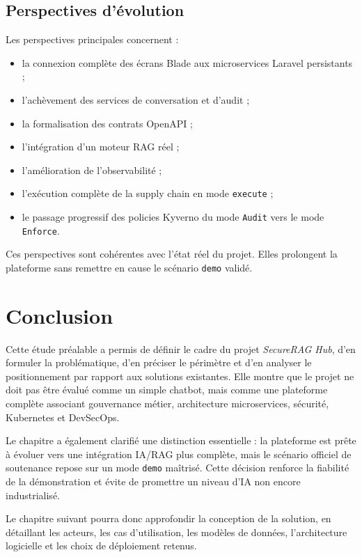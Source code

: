 \subsection{Perspectives d'évolution}

Les perspectives principales concernent :

\begin{itemize}
    \item la connexion complète des écrans Blade aux microservices Laravel persistants ;
    \item l'achèvement des services de conversation et d'audit ;
    \item la formalisation des contrats OpenAPI ;
    \item l'intégration d'un moteur RAG réel ;
    \item l'amélioration de l'observabilité ;
    \item l'exécution complète de la supply chain en mode \texttt{execute} ;
    \item le passage progressif des policies Kyverno du mode \texttt{Audit} vers le mode \texttt{Enforce}.
\end{itemize}

Ces perspectives sont cohérentes avec l'état réel du projet. Elles prolongent la plateforme sans remettre en cause le scénario \texttt{demo} validé.

\section{Conclusion}

Cette étude préalable a permis de définir le cadre du projet \textit{SecureRAG Hub}, d'en formuler la problématique, d'en préciser le périmètre et d'en analyser le positionnement par rapport aux solutions existantes. Elle montre que le projet ne doit pas être évalué comme un simple chatbot, mais comme une plateforme complète associant gouvernance métier, architecture microservices, sécurité, Kubernetes et DevSecOps.

Le chapitre a également clarifié une distinction essentielle : la plateforme est prête à évoluer vers une intégration IA/RAG plus complète, mais le scénario officiel de soutenance repose sur un mode \texttt{demo} maîtrisé. Cette décision renforce la fiabilité de la démonstration et évite de promettre un niveau d'IA non encore industrialisé.

Le chapitre suivant pourra donc approfondir la conception de la solution, en détaillant les acteurs, les cas d'utilisation, les modèles de données, l'architecture logicielle et les choix de déploiement retenus.
